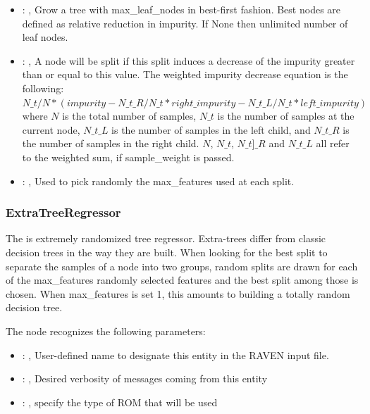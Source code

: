\begin{itemize}
    \item {}: ,
      Grow a tree with max\_leaf\_nodes in best-first fashion. Best nodes are defined as relative
      reduction                                                  in impurity. If None then unlimited
      number of leaf nodes.

    \item {}: ,
      A node will be split if this split induces a decrease of the impurity greater than or equal to
      this value.                                                  The weighted impurity decrease
      equation is the following:                                                  $N\_t / N *
      (impurity - N\_t\_R / N\_t * right\_impurity - N\_t\_L / N\_t * left\_impurity)$
      where $N$ is the total number of samples, $N\_t$ is the number of samples at the current node,
      $N\_t\_L$ is the number                                                  of samples in the
      left child, and $N\_t\_R$ is the number of samples in the right child.
      $N$, $N\_t$, $N\_t]\_R$ and $N\_t\_L$ all refer to the weighted sum, if sample\_weight is
      passed.

    \item {}: ,
      Used to pick randomly the max\_features used at each split.
  \end{itemize}


\subsubsection{ExtraTreeRegressor}
  The  is extremely randomized tree regressor.
  Extra-trees differ from classic decision trees in the way they are built. When
  looking for the best split to separate the samples of a node into two groups,
  random splits are drawn for each of the max\_features randomly selected features
  and the best split among those is chosen. When max\_features is set 1, this amounts
  to building a totally random decision tree.

  The  node recognizes the following parameters:
    \begin{itemize}
      \item {}: ,
        User-defined name to designate this entity in the RAVEN input file.
      \item {}: ,
        Desired verbosity of messages coming from this entity
      \item {}: ,
        specify the type of ROM that will be used
  \end{itemize}

